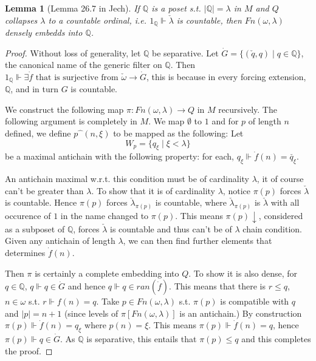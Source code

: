 \documentclass{article}
\newtheorem{lemma}{Lemma}
\newcommand{\bbQ}{\mathbb{Q}}
\begin{document}
\begin{lemma}[Lemma 26.7 in Jech]
    If $\bbQ$ is a poset s.t. $|\bbQ| = \lambda$ in $M$ and $Q$ collapses $\lambda$ to a countable ordinal, i.e. $1_\bbQ\Vdash \check{\lambda}$ is countable, then $Fn(\omega,\lambda)$ densely embedds into $\bbQ$.
\end{lemma}

\begin{proof}
    Without loss of generality, let $\bbQ$ be separative.
    Let $\dot{G} = \{(\check{q},q)\mid q\in \bbQ\}$, the canonical name of the generic filter on $\bbQ$. Then $1_\bbQ\Vdash \exists \dot{f} \text{ that is surjective from }\check{\omega}\to \dot{G}$, this is because in every forcing extension, $\bbQ$, and in turn $G$ is countable.

    We construct the following map $\pi: Fn(\omega,\lambda)\to Q$ in $M$ recursively. The following argument is completely in $M$. We map $\emptyset$ to $1$ and for $p$ of length $n$ defined, we define $p\widehat{\phantom{x}}(n, \xi)$ to be mapped as the following: Let $$W_p = \{q_\xi\mid \xi<\lambda \}$$ be a maximal antichain with the following property: for each, $q_\xi\Vdash \dot{f}(n) = \check{q_\xi}$.

    An antichain maximal w.r.t. this condition must be of cardinality $\lambda$, it of course can't be greater than $\lambda$. To show that it is of cardinality $\lambda$, notice $\pi(p)$ forces $\check{\lambda}$ is countable. Hence $\pi(p)$ forces $\check{\lambda}_{\pi(p)}$ is countable, where $\check{\lambda}_{\pi(p)}$ is $\check{\lambda}$ with all occurence of $1$ in the name changed to $\pi(p)$. This means $\pi(p)\downarrow$, considered as a subposet of $\bbQ$, forces $\check{\lambda}$ is countable and thus can't be of $\lambda$ chain condition. Given any antichain of length $\lambda$, we can then find further elements that determines $\dot{f}(n)$.
    
    Then $\pi$ is certainly a complete embedding into $Q$. To show it is also dense, for $q\in \bbQ$, $q\Vdash q\in \dot{G}$ and hence $q\Vdash q\in ran(\dot{f})$. This means that there is $r\leq q$, $n\in \omega$ s.t. $r\Vdash f(n) = q$. Take $p\in Fn(\omega,\lambda)$ s.t. $\pi(p)$ is compatible with $q$ and $|p| = n+1$ (since levels of $\pi[Fn(\omega,\lambda)]$ is an antichain.) By construction $\pi(p)\Vdash \dot{f}(n) = q_\xi$ where $p(n) = \xi$. This means $\pi(p)\Vdash \dot{f}(n) = q$, hence $\pi(p)\Vdash q\in \dot{G}$. As $\bbQ$ is separative, this entails that $\pi(p)\leq q$ and this completes the proof.
\end{proof}
\end{document}

